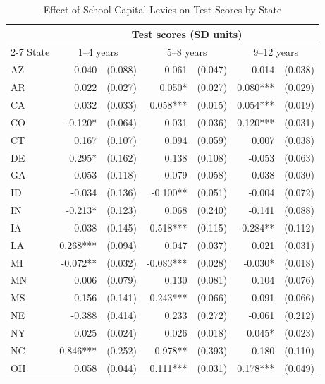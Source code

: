 \begin{table}[htbp]
    \centering
    \caption{Effect of School Capital Levies on Test Scores by State}
    \label{tab:state_test_scores}
    \begin{threeparttable}
    \begin{tabular}{l*{3}{r@{\hspace{3pt}}l}}
    \toprule
    & \multicolumn{6}{c}{Test scores (SD units)} \\
    \cmidrule(lr){2-7}
    State & \multicolumn{2}{c}{1--4 years} & \multicolumn{2}{c}{5--8 years} & \multicolumn{2}{c}{9--12 years} \\
    \midrule
    AZ & 0.040 & (0.088) & 0.061 & (0.047) & 0.014 & (0.038) \\
    AR & 0.022 & (0.027) & 0.050* & (0.027) & 0.080*** & (0.029) \\
    CA & 0.032 & (0.033) & 0.058*** & (0.015) & 0.054*** & (0.019) \\
    CO & -0.120* & (0.064) & 0.031 & (0.036) & 0.120*** & (0.031) \\
    CT & 0.167 & (0.107) & 0.094 & (0.059) & 0.007 & (0.038) \\
    DE & 0.295* & (0.162) & 0.138 & (0.108) & -0.053 & (0.063) \\
    GA & 0.053 & (0.118) & -0.079 & (0.058) & -0.038 & (0.030) \\
    ID & -0.034 & (0.136) & -0.100** & (0.051) & -0.004 & (0.072) \\
    IN & -0.213* & (0.123) & 0.068 & (0.240) & -0.141 & (0.088) \\
    IA & -0.038 & (0.145) & 0.518*** & (0.115) & -0.284** & (0.112) \\
    LA & 0.268*** & (0.094) & 0.047 & (0.037) & 0.021 & (0.031) \\
    MI & -0.072** & (0.032) & -0.083*** & (0.028) & -0.030* & (0.018) \\
    MN & 0.006 & (0.079) & 0.130 & (0.081) & 0.104 & (0.076) \\
    MS & -0.156 & (0.141) & -0.243*** & (0.066) & -0.091 & (0.066) \\
    NE & -0.388 & (0.414) & 0.233 & (0.272) & -0.061 & (0.212) \\
    NY & 0.025 & (0.024) & 0.026 & (0.018) & 0.045* & (0.023) \\
    NC & 0.846*** & (0.252) & 0.978** & (0.393) & 0.180 & (0.110) \\
    OH & 0.058 & (0.044) & 0.111*** & (0.031) & 0.178*** & (0.049) \\

\end{tabular}
\end{threeparttable}
\end{table}
